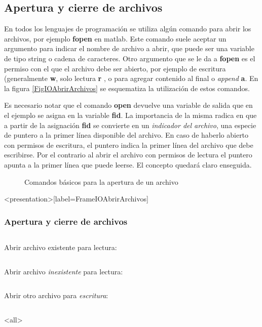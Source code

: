 \subsection{Apertura y cierre de archivos}
En todos los lenguajes de programación se utiliza algún comando
para abrir los archivos, por ejemplo \textbf{fopen} en matlab.
Este comando suele aceptar un argumento para indicar el
nombre de archivo a abrir, que puede ser una variable 
de tipo string o cadena de caracteres. Otro argumento
que se le da a \textbf{fopen} es el permiso con el 
que el archivo debe ser abierto, por ejemplo
de escritura (generalmente \textbf{w}, solo lectura \textbf{r}
, o para agregar contenido al final o \emph{append} \textbf{a}. 
En la figura \autoref{FigIOAbrirArchivos} se esquematiza
la utilización de estos comandos. 

Es necesario notar que el comando \textbf{open} devuelve
una variable de salida que en el ejemplo se asigna 
en la variable \textbf{fid}. 
La importancia de la misma radica en que a partir
de la asignación \textbf{fid} se convierte en 
un \emph{indicador del archivo}, una especie de puntero
a la primer línea disponible del archivo. En caso
de haberlo abierto con permisos de escritura, 
el puntero indica la primer línea del 
archivo que debe escribirse. Por el contrario
al abrir el archivo con permisos de lectura
el puntero apunta a la primer
línea que puede leerse. El concepto quedará 
claro enseguida. 

\begin{figure}
\caption{Comandos básicos para la apertura de un archivo\label{FigIOAbrirArchivos}}
\end{figure}

\mode*

\begin{frame}<presentation>[label=FrameIOAbrirArchivos]
\frametitle{Apertura y cierre de archivos}

\begin{columns}[T]
\hfill Abrir archivo existente para lectura:
\begin{codeblock}

\end{codeblock}
\end{columns}

\begin{columns}[T]
\hfill Abrir archivo \emph{inexistente} para lectura:
\begin{codeblock}

\end{codeblock}
\end{columns}

\begin{columns}[T]
\hfill Abrir otro archivo  para \emph{escritura}:
\begin{codeblock}

\end{codeblock}
\end{columns}

\end{frame}

\mode<all>

